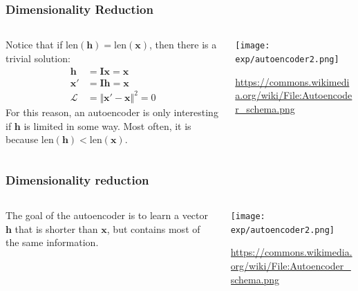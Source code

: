 \documentclass{beamer}
\begin{document}
\begin{frame}
  \frametitle{Dimensionality Reduction}
  \begin{columns}
    \begin{column}{0.5\textwidth}
      Notice that if $\text{len}(\bm{h})=\text{len}(\bm{x})$, then
      there is a trivial solution:
      \begin{align*}
        \bm{h}&=\bm{I}\bm{x}=\bm{x}\\
        \bm{x'}&=\bm{I}\bm{h}=\bm{x}\\
        \mathcal{L}&=\Vert\bm{x'}-\bm{x}\Vert^2=0
      \end{align*}
      For this reason, an autoencoder is only interesting if $\bm{h}$
      is limited in some way.  Most often, it is because
      $\text{len}(\bm{h})<\text{len}(\bm{x})$.
    \end{column}
    \begin{column}{0.5\textwidth}
      \texttt{[image: exp/autoencoder2.png]}

      \url{https://commons.wikimedia.org/wiki/File:Autoencoder_schema.png}
    \end{column}
  \end{columns}
\end{frame}

\begin{frame}
  \frametitle{Dimensionality reduction}
  \begin{columns}
    \begin{column}{0.5\textwidth}
      The goal of the autoencoder is to learn a vector $\bm{h}$ that
      is shorter than $\bm{x}$, but contains most of the same
      information.
    \end{column}
    \begin{column}{0.5\textwidth}
      \texttt{[image: exp/autoencoder2.png]}

      \url{https://commons.wikimedia.org/wiki/File:Autoencoder_schema.png}
    \end{column}
  \end{columns}
\end{frame}
\end{document}
